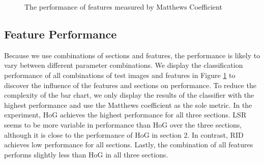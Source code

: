 \begin{figure}[]
	\caption{The performance of features measured by Matthews Coefficient}
	\label{fig:res_bar_0}
\end{figure}

\subsection{Feature Performance}

Because we use combinations of sections and features, the performance is likely to vary between different parameter combinations. We display the classification performance of all combinations of test images and features in Figure \ref{fig:res_bar_0} to discover the influence of the features and sections on performance. To reduce the complexity of the bar chart, we only display the results of the classifier with the highest performance and use the Matthews coefficient as the sole metric. In the experiment, HoG achieves the highest performance for all three sections. LSR seems to be more variable in performance than HoG over the three sections, although it is close to the performance of HoG in section 2. In contrast, RID achieves low performance for all sections. Lastly, the combination of all features performs slightly less than HoG in all three sections.


\dataone


